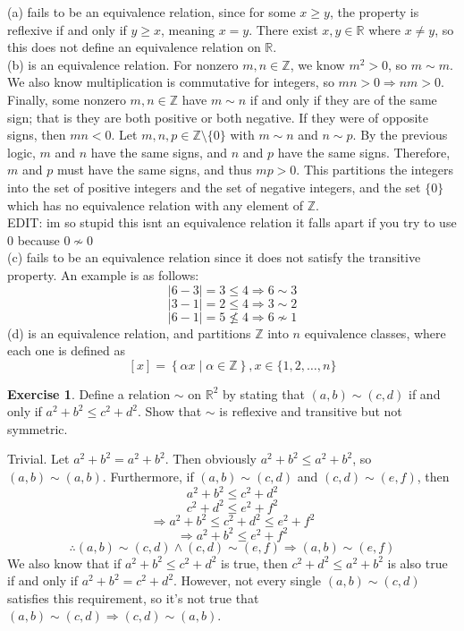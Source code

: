 \documentclass{article}
\theoremstyle{definition}
\newtheorem{environment}{Exercise}
\newenvironment{exercise}
    {\begin{mdframed}\begin{environment}}
    {\end{environment}\end{mdframed}}
\begin{document}
(a) fails to be an equivalence relation, since for some \(x\geq y\), the property is reflexive if and only if \(y\geq x\), meaning \(x=y\). There exist \(x,y\in\mathbb{R} \) where \(x\neq y\), so this does not define an equivalence relation on \(\mathbb{R} \).\\
(b) is an equivalence relation. For nonzero \(m,n\in\mathbb{Z} \), we know \(m^2 >0\), so \(m\sim m\). We also know multiplication is commutative for integers, so \(mn>0 \Longrightarrow nm>0\). Finally, some nonzero \(m,n\in\mathbb{Z} \) have \(m\sim n\) if and only if they are of the same sign; that is they are both positive or both negative. If they were of opposite signs, then \(m n<0\). Let \(m,n,p\in\mathbb{Z}\setminus \{ 0 \}  \) with \(m\sim n\) and \(n\sim p\). By the previous logic, \(m\) and \(n\) have the same signs, and \(n\) and \(p\) have the same signs. Therefore, \(m\) and \(p\) must have the same signs, and thus \(mp>0\). This partitions the integers into the set of positive integers and the set of negative integers, and the set \(\{ 0 \} \) which has no equivalence relation with any element of \(\mathbb{Z} \).\\
EDIT: im so stupid this isnt an equivalence relation it falls apart if you try to use 0 because \(0 \nsim 0\) \\
(c) fails to be an equivalence relation since it does not satisfy the transitive property. An example is as follows:
\[
    |6-3| =3\leq 4 \Longrightarrow 6\sim 3
\]
\[
    |3-1| =2\leq 4 \Longrightarrow 3\sim 2
\]
\[
    |6-1| =5 \nleq 4 \Longrightarrow  6 \nsim 1
\]
(d) is an equivalence relation, and partitions \(\mathbb{Z} \) into \(n\) equivalence classes, where each one is defined as 
\[
    [x]=\left\{ \alpha x \mid \alpha \in\mathbb{Z}  \right\}, x\in \{ 1,2,\ldots,n \} 
\]
\begin{exercise}
    Define a relation \(\sim \) on \(\mathbb{R} ^2\) by stating that \((a,b)\sim (c,d)\) if and only if \(a^2 +b^2 \leq c^2 +d^2\). Show that \(\sim \) is reflexive and transitive but not symmetric.
\end{exercise}
Trivial. Let \(a^2 +b^2 = a^2 +b^2\). Then obviously \(a^2 +b^2 \leq a^2 +b^2\), so \((a,b)\sim (a,b)\). Furthermore, if \((a,b)\sim (c,d)\) and \((c,d)\sim (e,f)\), then
\[
    a^2 +b^2 \leq  c^2 +d^2
\]
\[
    c^2 +d^2 \leq e^2 +f^2
\]
\[
    \Longrightarrow a^2 +b^2 \leq c^2 +d^2 \leq e^2 +f^{2} 
\]
\[
    \Longrightarrow a^2+b^2 \leq e^2 +f^2
\]
\[
    \therefore (a,b)\sim (c,d)\land (c,d)\sim (e,f)\Longrightarrow (a,b)\sim (e,f)
\]
We also know that if \(a^2 +b^2 \leq c^2 +d^2\) is true, then \(c^2 +d^2 \leq a^2 +b^2\) is also true if and only if \(a^2 +b^2 = c^2 +d^2\). However, not every single \((a,b)\sim (c,d)\) satisfies this requirement, so it's not true that \((a,b)\sim (c,d)\Longrightarrow (c,d)\sim (a,b)\).
\end{document}
